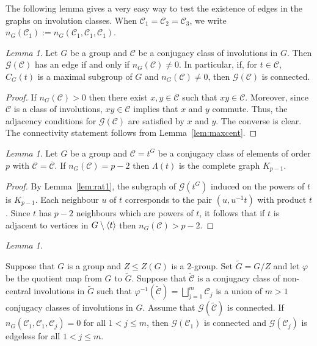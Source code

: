 \documentclass[11pt,a4paper]{amsart}
\theoremstyle{plain}
\theoremstyle{definition}
\theoremstyle{remark}
\newtheorem{lemma}[definition]{Lemma}
\theoremstyle{remark}
\theoremstyle{remark}
\theoremstyle{definition}
\newcommand{\GG}{\mathcal{G}}
\DeclarePairedDelimiter{\gen}{\langle}{\rangle}
\begin{document}
The following lemma gives a very easy way to test the existence of edges in the graphs on involution classes. When $\mathcal{C}_1=\mathcal{C}_2=\mathcal{C}_3$, we write $n_G(\mathcal{C}_1):=n_G(\mathcal{C}_1,\mathcal{C}_1,\mathcal{C}_1)$.
\begin{lemma}\label{lem:edgeexist}
Let $G$ be a group and $\mathcal{C}$ be a conjugacy class of involutions in $G$. Then $\GG(\mathcal{C})$ has an edge if and only if $n_G(\mathcal{C})\ne 0$. In particular, if, for $t \in \mathcal C$, $C_G(t)$ is a maximal subgroup of $G$ and $n_G(\mathcal{C})\ne 0$, then $\GG(\mathcal{C})$ is connected.
\end{lemma}
\begin{proof}
If $n_G(\mathcal{C})>0$ then there exist $x,y\in\mathcal{C}$ such that $xy\in\mathcal{C}$. Moreover, since $\mathcal{C}$ is a class of involutions, $xy\in\mathcal{C}$ implies that $x$ and $y$ commute. Thus, the adjacency conditions for $\GG(\mathcal{C})$ are satisfied by $x$ and $y$. The converse is clear. The connectivity statement follows from Lemma~\ref{lem:maxcent}.
\end{proof}
\begin{lemma}\label{lem:cliques}
Let $G$ be a group and $\mathcal{C}=t^G$ be a conjugacy class of elements of order $p$ with $\mathcal{C}=\overline{\mathcal{C}}$. If $n_G(\mathcal{C})=p-2$ then $\Lambda(t)$ is the complete graph $K_{p-1}$.
\end{lemma}
\begin{proof} By Lemma~\ref{lem:rat1}, the subgraph of $\GG(t^G)$ induced on the powers of $t$ is $K_{p-1}$. Each neighbour $u$ of $t$ corresponds to the pair $(u,u^{-1}t)$ with product $t$. Since $t$ has $p-2$ neighbours which are powers of $t$, it follows that if $t$ is adjacent to vertices in $G\setminus \gen{t}$ then $n_G(\mathcal{C})>p-2$.
\end{proof}
\begin{lemma}\label{lem:covermulticlass}

Suppose that $G$ is a group and $Z \le Z(G)$ is a $2$-group. Set $\widetilde{G}=G/Z$ and let $\varphi$ be the quotient map from $G$ to $\widetilde{G}$. Suppose that $\widetilde{\mathcal{C}}$ is a conjugacy class of non-central involutions in $\widetilde G$ such that $ \varphi^{-1}(\widetilde{\mathcal{C}})= \bigsqcup_{j=1}^m\mathcal{C}_j $ is a union of $m>1$ conjugacy classes of involutions in $G$. Assume that $\GG(\widetilde{\mathcal{C}})$ is connected. If $n_G(\mathcal{C}_1,\mathcal{C}_1,\mathcal{C}_j)=0$ for all $1< j\leq m$, then $\GG(\mathcal{C}_1)$ is connected and $\GG(\mathcal{C}_j)$ is edgeless for all $1<j\leq m$.
\end{lemma}
\end{document}
